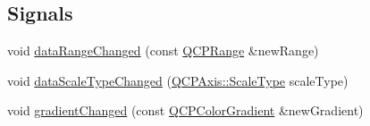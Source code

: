 \subsection*{Signals}
\begin{DoxyCompactItemize}
\item 
void \hyperlink{classQCPColorScale_a685717490a6aa83c5e711a4f34e837f9}{data\+Range\+Changed} (const \hyperlink{classQCPRange}{Q\+C\+P\+Range} \&new\+Range)
\item 
void \hyperlink{classQCPColorScale_a61558b962f7791ff2f15a565dcf60181}{data\+Scale\+Type\+Changed} (\hyperlink{classQCPAxis_a36d8e8658dbaa179bf2aeb973db2d6f0}{Q\+C\+P\+Axis\+::\+Scale\+Type} scale\+Type)
\item 
void \hyperlink{classQCPColorScale_a5e5f8c5626242c8f7308bfab74d3d989}{gradient\+Changed} (const \hyperlink{classQCPColorGradient}{Q\+C\+P\+Color\+Gradient} \&new\+Gradient)
\end{DoxyCompactItemize}
